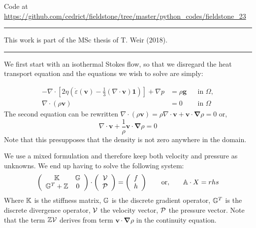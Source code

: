 

\begin{center}
Code at \url{https://github.com/cedrict/fieldstone/tree/master/python_codes/fieldstone_23}
\end{center}

\par\noindent\rule{\textwidth}{0.4pt}

This work is part of the MSc thesis of T. Weir (2018).

\par\noindent\rule{\textwidth}{0.4pt}

We first start with an isothermal Stokes flow, so that we disregard the heat transport equation and 
the equations we wish to solve are simply:

\begin{align}
  -\nabla \cdot \left[2\eta \left(\dot\varepsilon(\bm v)
                                  - \frac{1}{3}(\nabla \cdot \bm v)\mathbf 1\right)
                \right] + \nabla p &=
  \rho \bm g
  &
  & \textrm{in $\Omega$},
  \\
  \nabla \cdot (\rho \bm v) &= 0
  &
  & \textrm{in $\Omega$}
\end{align}
The second equation can be rewritten 
$\nabla \cdot (\rho {\bm v}) =  \rho \nabla \cdot {\bm v} + {\bm v} \cdot {\bm \nabla}\rho=0$
or, 
\[
\nabla \cdot {\bm v} + \frac{1}{\rho} {\bm v} \cdot {\bm \nabla}\rho=0
\]
Note that this presupposes that the density is not zero anywhere in the domain.

We use a mixed formulation and therefore  
keep both velocity and pressure as unknowns. We end up having to solve 
the following system:
\[
\left(
\begin{array}{cc}
{\mathbb{K}} & {\mathbb{G}} \\ {\mathbb{G}}^T+{\mathbb{Z}} & 0 
\end{array}
\right)
\cdot
\left(
\begin{array}{c}
{\cal V} \\ {\cal P}
\end{array}
\right)
=
\left(
\begin{array}{c}
 f \\ h
\end{array}
\right)
\quad\quad
{\rm or,}
\quad\quad
{\mathbb{A}} \cdot X = rhs
\]
Where ${\mathbb{K}}$ is the stiffness matrix, ${\mathbb{G}}$ is the discrete gradient operator, 
${\mathbb{G}}^T$ is the discrete divergence operator, ${\cal V}$ the velocity vector, 
${\cal P}$ the pressure vector.
Note that the term ${\mathbb{Z}}{\cal V}$ derives from term ${\bm v} \cdot {\bm \nabla} \rho$ in the continuity equation. 

